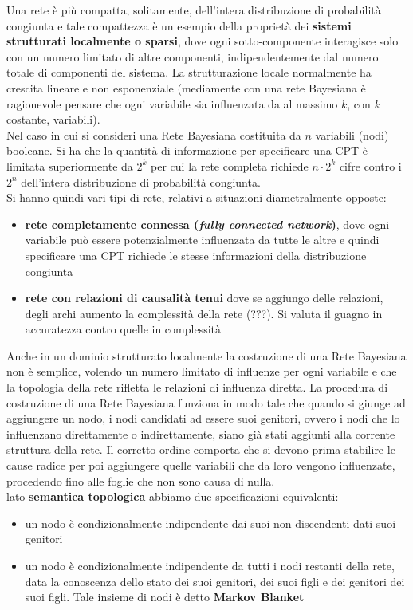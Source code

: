 \message{ !name(modprob.tex)}\documentclass[a4paper,12pt, oneside]{book}
\begin{document}
Una rete è più compatta, solitamente, dell'intera distribuzione di probabilità
congiunta e tale compattezza è un esempio della proprietà dei \textbf{sistemi
  strutturati localmente o sparsi}, dove ogni sotto-componente interagisce solo
con un numero limitato di 
altre componenti, indipendentemente dal numero totale di componenti del
sistema. La strutturazione locale normalmente ha crescita lineare e non
esponenziale (mediamente con una rete Bayesiana è ragionevole pensare che ogni
variabile sia influenzata da al massimo $k$, con $k$ costante, variabili).\\  
Nel caso in cui si consideri una Rete Bayesiana costituita da $n$ variabili
(nodi) booleane. Si ha che la quantità di informazione per specificare una CPT è
limitata superiormente da $2^k$ per cui la rete completa richiede $n\cdot 2^k$
cifre contro i $2^n$ dell'intera distribuzione di probabilità congiunta.\\
Si hanno quindi vari tipi di rete, relativi a situazioni diametralmente opposte:
\begin{itemize}
  \item \textbf{rete completamente connessa (\textit{fully connected network})},
  dove ogni variabile può essere potenzialmente influenzata da tutte le altre e
  quindi specificare una CPT richiede le stesse informazioni della distribuzione
  congiunta
  \item \textbf{rete con relazioni di causalità tenui} dove se aggiungo delle
  relazioni, degli archi aumento la complessità della rete (???). Si valuta il
  guagno in accuratezza contro quelle in complessità
\end{itemize}
Anche in un dominio strutturato localmente la costruzione di una Rete Bayesiana
non è semplice, volendo un numero limitato di influenze per ogni variabile e che
la topologia della rete rifletta le relazioni di influenza diretta. La procedura
di costruzione di una Rete Bayesiana funziona in modo tale che quando si giunge
ad aggiungere un nodo, i nodi candidati ad essere suoi genitori, ovvero i nodi
che lo influenzano direttamente o indirettamente, siano già stati aggiunti alla
corrente struttura della rete. Il corretto ordine comporta che si devono prima
stabilire le cause radice per poi aggiungere quelle variabili che da loro
vengono influenzate, procedendo fino alle foglie che non sono causa di nulla. \\
lato \textbf{semantica topologica} abbiamo due specificazioni equivalenti:
\begin{itemize}
  \item un nodo è condizionalmente indipendente dai suoi non-discendenti dati
  suoi genitori
  \item un nodo è condizionalmente indipendente da tutti i nodi restanti della
  rete, data la conoscenza dello stato dei suoi genitori, dei suoi figli e dei
  genitori dei suoi figli. Tale insieme di nodi è detto \textbf{Markov Blanket}
\end{itemize}
\end{document}
